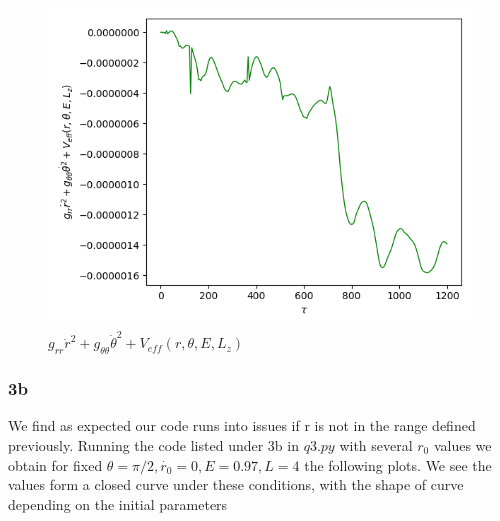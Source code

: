\documentclass[10pt,a4paper]{report}
\begin{document}
\begin{figure}[!ht]
\begin{minipage}[b]{0.5\linewidth}
\centering
\includegraphics[width=\textwidth]{3a/Veff.png}
\caption{$g_{rr}\dot{r}^2+g_{\theta\theta}\dot{\theta}^2 + V_{eff}(r, \theta, E, L_z)$}
\label{fig:figure1}
\end{minipage}
\end{figure}

\newpage

\subsubsection*{3b}

We find as expected our code runs into issues if r is not in the range defined previously. Running the code listed under 3b in $q3.py$ with several $r_0$ values  we obtain for fixed $\theta=\pi/2, \dot{r_0}=0, E=0.97, L=4$ the following plots. We see the values form a closed curve under these conditions, with the shape of curve depending on the initial parameters
\end{document}
